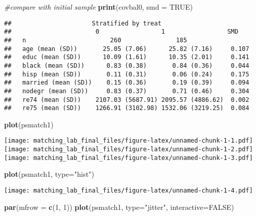 \documentclass[]{article}
\newenvironment{Shaded}{\begin{snugshade}}{\end{snugshade}}
\newcommand{\CommentTok}[1]{\textcolor[rgb]{0.56,0.35,0.01}{\textit{#1}}}
\newcommand{\DataTypeTok}[1]{\textcolor[rgb]{0.13,0.29,0.53}{#1}}
\newcommand{\DecValTok}[1]{\textcolor[rgb]{0.00,0.00,0.81}{#1}}
\newcommand{\KeywordTok}[1]{\textcolor[rgb]{0.13,0.29,0.53}{\textbf{#1}}}
\newcommand{\NormalTok}[1]{#1}
\newcommand{\OtherTok}[1]{\textcolor[rgb]{0.56,0.35,0.01}{#1}}
\newcommand{\StringTok}[1]{\textcolor[rgb]{0.31,0.60,0.02}{#1}}
\begin{document}
\begin{Shaded}
\begin{Highlighting}[]
\CommentTok{#compare with initial sample}
\KeywordTok{print}\NormalTok{(covbal0, }\DataTypeTok{smd =} \OtherTok{TRUE}\NormalTok{)}
\end{Highlighting}
\end{Shaded}

\begin{verbatim}
##                      Stratified by treat
##                       0                 1                 SMD   
##   n                       260               185                 
##   age (mean (SD))       25.05 (7.06)      25.82 (7.16)     0.107
##   educ (mean (SD))      10.09 (1.61)      10.35 (2.01)     0.141
##   black (mean (SD))      0.83 (0.38)       0.84 (0.36)     0.044
##   hisp (mean (SD))       0.11 (0.31)       0.06 (0.24)     0.175
##   married (mean (SD))    0.15 (0.36)       0.19 (0.39)     0.094
##   nodegr (mean (SD))     0.83 (0.37)       0.71 (0.46)     0.304
##   re74 (mean (SD))    2107.03 (5687.91) 2095.57 (4886.62)  0.002
##   re75 (mean (SD))    1266.91 (3102.98) 1532.06 (3219.25)  0.084
\end{verbatim}

\begin{Shaded}
\begin{Highlighting}[]
\KeywordTok{plot}\NormalTok{(psmatch1)}
\end{Highlighting}
\end{Shaded}

\texttt{[image: matching\_lab\_final\_files/figure-latex/unnamed-chunk-1-1.pdf]}
\texttt{[image: matching\_lab\_final\_files/figure-latex/unnamed-chunk-1-2.pdf]}
\texttt{[image: matching\_lab\_final\_files/figure-latex/unnamed-chunk-1-3.pdf]}

\begin{Shaded}
\begin{Highlighting}[]
\KeywordTok{plot}\NormalTok{(psmatch1, }\DataTypeTok{type=}\StringTok{"hist"}\NormalTok{)}
\end{Highlighting}
\end{Shaded}

\texttt{[image: matching\_lab\_final\_files/figure-latex/unnamed-chunk-1-4.pdf]}

\begin{Shaded}
\begin{Highlighting}[]
\KeywordTok{par}\NormalTok{(}\DataTypeTok{mfrow =} \KeywordTok{c}\NormalTok{(}\DecValTok{1}\NormalTok{, }\DecValTok{1}\NormalTok{))}
\KeywordTok{plot}\NormalTok{(psmatch1, }\DataTypeTok{type=}\StringTok{"jitter"}\NormalTok{, }\DataTypeTok{interactive=}\OtherTok{FALSE}\NormalTok{)}
\end{Highlighting}
\end{Shaded}
\end{document}
